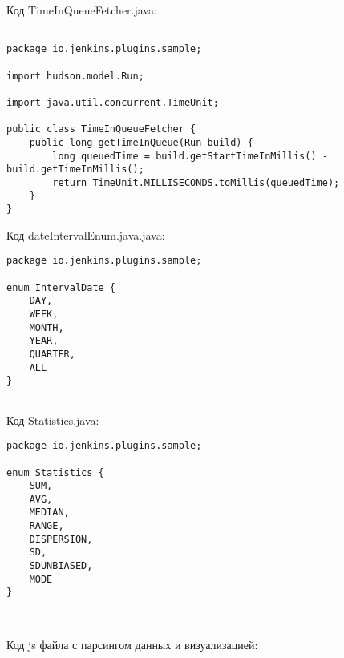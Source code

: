 Код TimeInQueueFetcher.java:

\begin{lstlisting}

package io.jenkins.plugins.sample;

import hudson.model.Run;

import java.util.concurrent.TimeUnit;

public class TimeInQueueFetcher {
    public long getTimeInQueue(Run build) {
        long queuedTime = build.getStartTimeInMillis() - build.getTimeInMillis();
        return TimeUnit.MILLISECONDS.toMillis(queuedTime);
    }
}

\end{lstlisting}

Код dateIntervalEnum.java.java:

\begin{lstlisting}
package io.jenkins.plugins.sample;

enum IntervalDate {
    DAY,
    WEEK,
    MONTH,
    YEAR,
    QUARTER,
    ALL
}


\end{lstlisting}

Код Statistics.java:

\begin{lstlisting}
package io.jenkins.plugins.sample;

enum Statistics {
    SUM,
    AVG,
    MEDIAN,
    RANGE,
    DISPERSION,
    SD,
    SDUNBIASED,
    MODE
}



\end{lstlisting}

Код js файла с парсингом данных и визуализацией:

